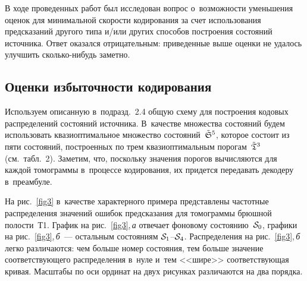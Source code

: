 \begin{multicols}{2}
В ходе проведенных работ был исследован вопрос о~возможности уменьшения 
оценок для минимальной скорости кодирования за счет использования предсказаний 
другого типа и/или других способов построения состояний источника. Ответ оказался 
отрицательным: приведенные выше оценки не удалось улучшить сколь\-ко-ни\-будь заметно.
{

}

\subsection{Оценки избыточности кодирования}

Используем описанную в~подразд.~2.4 общую схему для построения кодовых 
распределений состо\-яний источника. В~качестве множества состояний будем использовать 
квазиоптимальное множество со\-сто\-яний~${\tilde{\frak S}^5}$, которое состоит из пяти 
со\-сто\-яний, построенных по трем квазиоптимальным порогам~${\tilde{\frak T}^3}$ (см.\
  табл.~2). Заметим, что, поскольку значения порогов вычисляются для
   каждой томограммы в~процессе кодирования, их придется передавать декодеру 
   в~преамбуле.

На рис.~\ref{fig3} в~качестве характерного примера представлены частотные 
распределения значений ошибок предсказания для томограммы брюшной полости~Т1. 
График на рис.~\ref{fig3},\,\textit{а} отвечает фоновому состоянию~${\cal S}_0$, 
графики на рис.~\ref{fig3},\,\textit{б}~--- 
остальным состояниям ${\cal S}_1$--${\cal S}_4$. Распределения на 
рис.~\ref{fig3},\,\textit{б} легко различаются: чем больше номер состояния, 
тем больше значение соответствующего распределения в~нуле и~тем <<шире>> 
соответствующая кривая. Масштабы по оси ординат на двух рисунках различаются 
на два порядка.




\end{multicols}
